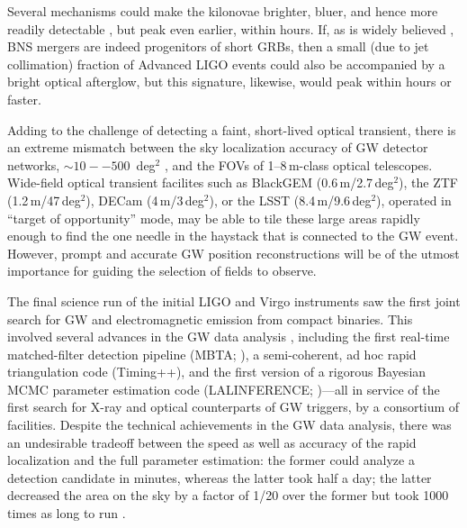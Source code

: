 \documentclass[amsmath,amssymb,aps,prx,reprint,nopreprintnumbers,nofootinbib]{revtex4-1}
\begin{document}
Several mechanisms could make the kilonovae brighter, bluer, and hence more readily detectable \citep{KilonovaPrecursor,KilonovaRedOrBlue}, but peak even earlier, within hours. If, as is widely believed \citep{1986ApJ...308L..43P,1989Natur.340..126E,1992ApJ...395L..83N,2011ApJ...732L...6R}, \ac{BNS} mergers are indeed progenitors of short \acp{GRB}, then a small (due to jet collimation) fraction of Advanced \ac{LIGO} events could also be accompanied by a bright optical afterglow, but this signature, likewise, would peak within hours or faster.

Adding to the challenge of detecting a faint, short-lived optical transient, there is an extreme mismatch between the sky localization accuracy of \ac{GW} detector networks, $\sim 10--500$~deg$^2$ \citep{FairhurstTriangulation,WenLocalizationAdvancedLIGO,FairhurstLocalizationAdvancedLIGO,2011PhRvD..84j4020V,RodriguezBasicParameterEstimation,NissankeLocalization,NissankeKasliwalEMCounterparts,KasliwalTwoDetectors,Grover:2013,SiderySkyLocalizationComparison,FirstTwoYears}, and the \acp{FOV} of 1\nobreakdashes--8\,m\nobreakdashes-class optical telescopes. Wide\nobreakdashes-field optical transient facilites such as BlackGEM (0.6\,m/2.7\,deg$^2$), the \acl{ZTF} \cite{ZTF} (1.2\,m/47\,deg$^2$), DECam (4\,m/3\,deg$^2$), or the \acf{LSST} (8.4\,m/9.6\,deg$^2$), operated in ``target of opportunity'' mode, may be able to tile these large areas rapidly enough to find the one needle in the haystack that is connected to the \ac{GW} event. However, prompt and accurate \ac{GW} position reconstructions will be of the utmost importance for guiding the selection of fields to observe.

The final science run of the initial LIGO and Virgo instruments saw the first joint search for \ac{GW} and electromagnetic emission from compact binaries. This involved several advances in the \ac{GW} data analysis \citep{CBCLowLatency}, including the first real\nobreakdashes-time matched\nobreakdashes-filter detection pipeline (\acs{MBTA}; ), a semi\nobreakdashes-coherent, ad hoc rapid triangulation code (Timing++), and the first version of a rigorous Bayesian \ac{MCMC} parameter estimation code (LALINFERENCE; \citealt{S6PE})---all in service of the first search for X\nobreakdashes-ray \citep{SwiftFollowup} and optical \citep{OpticalImageAnalysis} counterparts of \ac{GW} triggers, by a consortium of facilities. Despite the technical achievements in the \ac{GW} data analysis, there was an undesirable tradeoff between the speed as well as accuracy of the rapid localization and the full parameter estimation: the former could analyze a detection candidate in minutes, whereas the latter took half a day; the latter decreased the area on the sky by a factor of 1/20 over the former but took 1000 times as long to run \cite{SiderySkyLocalizationComparison}.
\end{document}

